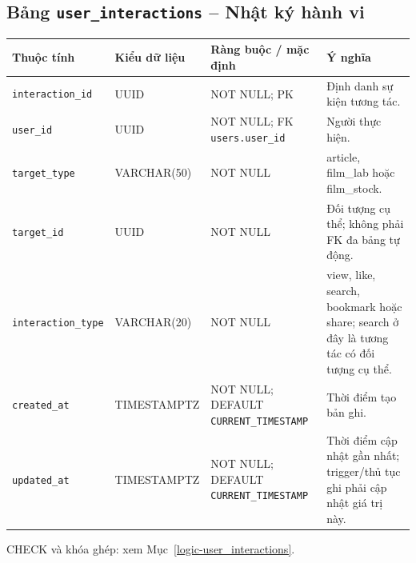 \subsection{Bảng \texttt{user\_\allowbreak{}interactions} -- Nhật ký hành vi}
\label{dictionary-user_interactions}
\begingroup
\footnotesize
\setlength{\tabcolsep}{3pt}
\begin{longtable}{>{\raggedright\arraybackslash}p{3.1cm}>{\raggedright\arraybackslash}p{2.5cm}>{\raggedright\arraybackslash}p{3.7cm}>{\raggedright\arraybackslash}p{4.3cm}}
\toprule
Thuộc tính & Kiểu dữ liệu & Ràng buộc / mặc định & Ý nghĩa \\
\midrule
\endhead
\texttt{interaction\_\allowbreak{}id} & UUID & NOT NULL; PK & Định danh sự kiện tương tác. \\
\texttt{user\_\allowbreak{}id} & UUID & NOT NULL; FK \texttt{users.user\_\allowbreak{}id} & Người thực hiện. \\
\texttt{target\_\allowbreak{}type} & VARCHAR(50) & NOT NULL & article, film\_lab hoặc film\_stock. \\
\texttt{target\_\allowbreak{}id} & UUID & NOT NULL & Đối tượng cụ thể; không phải FK đa bảng tự động. \\
\texttt{interaction\_\allowbreak{}type} & VARCHAR(20) & NOT NULL & view, like, search, bookmark hoặc share; search ở đây là tương tác có đối tượng cụ thể. \\
\texttt{created\_\allowbreak{}at} & TIMESTAMPTZ & NOT NULL; DEFAULT \texttt{CURRENT\_\allowbreak{}TIMESTAMP} & Thời điểm tạo bản ghi. \\
\texttt{updated\_\allowbreak{}at} & TIMESTAMPTZ & NOT NULL; DEFAULT \texttt{CURRENT\_\allowbreak{}TIMESTAMP} & Thời điểm cập nhật gần nhất; trigger/thủ tục ghi phải cập nhật giá trị này. \\
\bottomrule
\end{longtable}
\endgroup
CHECK và khóa ghép: xem Mục~\ref{logic-user_interactions}.
